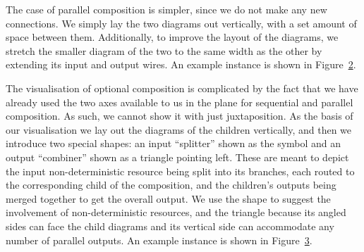 \documentclass[class=smolathesis,crop=false]{standalone}
\begin{document}
\begin{figure}[h]
  \centering
  
  \caption{}
  \label{fig:process-diagrams/Seq}
\end{figure}

\cbstart
The case of parallel composition is simpler, since we do not make any new connections.
We simply lay the two diagrams out vertically, with a set amount of space between them.
Additionally, to improve the layout of the diagrams, we stretch the smaller diagram of the two to the same width as the other by extending its input and output wires.
An example instance is shown in Figure~\ref{fig:process-diagrams/Par}.
\cbend

\begin{figure}[h]
  \centering
  
  \caption{}
  \label{fig:process-diagrams/Par}
\end{figure}

\cbstart
The visualisation of optional composition is complicated by the fact that we have already used the two axes available to us in the plane for sequential and parallel composition.
As such, we cannot show it with just juxtaposition.
As the basis of our visualisation we lay out the diagrams of the children vertically, and then we introduce two special shapes: an input ``splitter'' shown as the \isa{\isasymoplus} symbol and an output ``combiner'' shown as a triangle pointing left.
These are meant to depict the input non-deterministic resource being split into its branches, each routed to the corresponding child of the composition, and the children's outputs being merged together to get the overall output.
We use the \isa{\isasymoplus} shape to suggest the involvement of non-deterministic resources, and the triangle because its angled sides can face the child diagrams and its vertical side can accommodate any number of parallel outputs.
An example instance is shown in Figure~\ref{fig:process-diagrams/Opt}.
\cbend

\begin{figure}[h]
  \centering
  
  \caption{}
  \label{fig:process-diagrams/Opt}
\end{figure}
\end{document}
